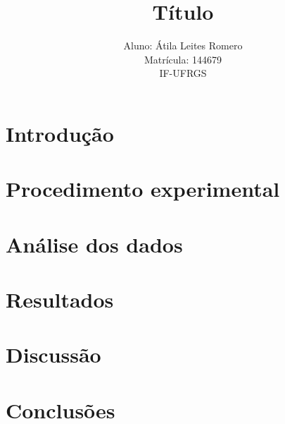 \documentclass[brazilian,12pt,a4paper,final]{article}
\title{Título}
\author{Aluno: Átila Leites Romero \\ Matrícula: 144679 \\ IF-UFRGS}
\begin{document}
\maketitle

\begin{abstract}
\end{abstract}

\section{Introdução} 

\section{Procedimento experimental}

\section{Análise dos dados}

\section{Resultados}

\section{Discussão}

\section{Conclusões}


\begin{thebibliography}{99}
\end{thebibliography}
\end{document}
